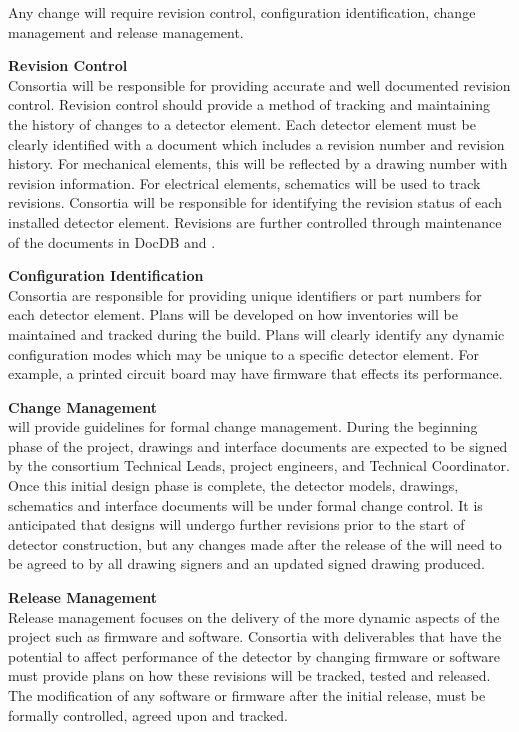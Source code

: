 Any change will require revision control, configuration
identification, change management and release management.

{\bf Revision Control}\\ Consortia will be responsible for providing
accurate and well documented revision control.  Revision control
should 
 provide a method of tracking and maintaining the history of
changes to a detector element.  Each detector element must be clearly
identified with a document which includes a revision number and
revision history.  For mechanical elements, this will be reflected by
a drawing number with revision information.  For electrical elements,
schematics will be used to track revisions.  Consortia will be
responsible for identifying the revision status of each installed
detector element. Revisions are further controlled through maintenance
of the documents in DocDB and .

{\bf Configuration Identification}\\
Consortia are responsible for providing unique identifiers or part
numbers for each detector element.  Plans will be developed on how
inventories will be maintained and tracked during the build.  Plans
will clearly identify any dynamic configuration modes which may be
unique to a specific detector element.  For example, a printed circuit
board may have firmware that effects its performance.

{\bf Change Management}\\
 will provide guidelines
for formal change management.  During the beginning phase of the
project, drawings and interface documents are expected to be signed by
the consortium Technical Leads, project engineers, and Technical
Coordinator.  Once this initial design phase is complete, the detector
models, drawings, schematics and interface documents will be under
formal change control.  It is anticipated that designs will undergo
further revisions prior to the start of detector construction, but any
changes made after the release of the  will
need to be agreed to by all drawing signers and an updated signed
drawing produced.

{\bf Release Management}\\
Release management focuses on the delivery of the more dynamic aspects
of the project such as firmware and software.  Consortia with
deliverables that have the potential to affect performance of the
detector by changing firmware or software must provide plans on how
these revisions will be tracked, tested and released.  The
modification of any software or firmware after the initial release,
must be formally controlled, agreed upon and tracked.



